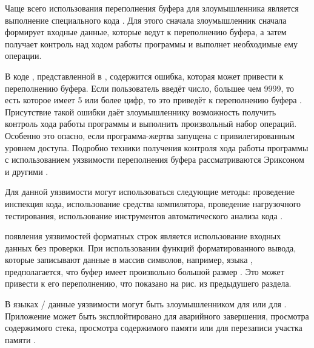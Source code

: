 %
Чаще всего  использования переполнения буфера для злоумышленника является выполнение специального кода . 
%
Для этого сначала злоумышленник сначала формирует входные данные, которые ведут к переполнению буфера, а затем получает контроль над ходом работы программы и выполнет необходимые ему операции. 

%
В коде , представленной в , содержится ошибка, которая может привести к переполнению буфера.
%
Если пользователь введёт число, большее чем 9999, то есть которое имеет 5 или более цифр, то это приведёт к переполнению буфера .
%
Присутствие такой ошибки даёт злоумышленнику возможность получить контроль хода работы программы и выполнить произвольный набор операций.
%
Особенно это опасно, если программа-жертва запущена с привилегированным уровнем доступа.
%
Подробно техники получения контроля хода работы программы с использованием уязвимости переполнения буфера рассматриваются Эриксоном и другими  .

%
Для  данной уязвимости могут использоваться следующие методы: проведение инспекция кода, использование средства компилятора, проведение нагрузочного тестирования, использование инструментов автоматического анализа кода   .



%
 появления уязвимостей форматных строк является использование входных данных без проверки. 
%
При использовании функций форматированного вывода, которые записывают данные в массив символов, например,  языка , предполагается, что буфер имеет произвольно большой размер . 
%
Это может привести к его переполнению, что показано на рис. из предыдушего раздела.

%
В языках / данные уязвимости могут быть  злоумышленником для  или для  . 
%
Приложение может быть эксплойтировано для аварийного завершения, просмотра содержимого стека, просмотра содержимого памяти или для перезаписи участка памяти   . 

